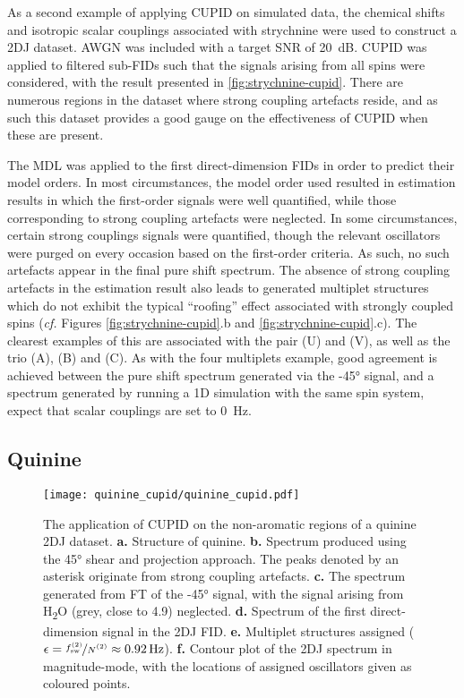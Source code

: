 As a second example of applying \ac{CUPID} on simulated data, the chemical
shifts and isotropic scalar couplings associated with strychnine
were used to construct a 2DJ dataset. \ac{AWGN} was included with a target
\ac{SNR} of \qty{20}{\deci\bel}. CUPID was applied to filtered
sub-FIDs such that the signals arising from all spins were considered, with the
result presented in \cref{fig:strychnine-cupid}. There are numerous
regions in the dataset where strong coupling artefacts reside, and as such this
dataset provides a good gauge on the effectiveness of \ac{CUPID} when these are
present.

The \ac{MDL} was applied to the first direct-dimension \acp{FID} in order to
predict their model orders. In most circumstances, the model order used resulted
in estimation results in which the first-order signals were well
quantified, while those corresponding to strong coupling artefacts were neglected.
In some circumstances, certain strong couplings signals were quantified, though
the relevant oscillators were purged on every occasion based on the first-order
criteria. As such, no such artefacts appear in the final pure shift spectrum.
The absence of strong coupling artefacts in the estimation result also leads to
generated multiplet structures which do not exhibit the typical ``roofing''
effect associated with strongly coupled spins (\textit{cf.} Figures
\ref{fig:strychnine-cupid}.b and \ref{fig:strychnine-cupid}.c). The clearest
examples of this are associated with the pair (U) and (V), as well as the trio (A),
(B) and (C). As with the four multiplets example, good agreement is achieved
between the pure shift spectrum generated via the \ang{-45} signal, and a
spectrum generated by running a \ac{1D} simulation with the same spin system,
expect that scalar couplings are set to \qty{0}{\hertz}.

\subsection{Quinine}
\begin{figure}
    \centering
    \texttt{[image: quinine\_cupid/quinine\_cupid.pdf]}
    \caption[
        The application of \acs{CUPID} on a quinine \acs{2DJ} dataset.
    ]{
        The application of \ac{CUPID} on the non-aromatic regions of a quinine
        \ac{2DJ} dataset.
        \textbf{a.} Structure of quinine.
        \textbf{b.} Spectrum produced using the \ang{45} shear and projection
        approach. The peaks denoted by an asterisk originate from strong
        coupling artefacts.
        \textbf{c.} The spectrum generated from \ac{FT} of the \ang{-45}
        signal, with the signal arising from H\textsubscript{2}O (grey, close
        to \qty{4.9}{\partspermillion}) neglected.
        \textbf{d.} Spectrum of the first direct-dimension signal in the
        \ac{2DJ} \ac{FID}.
        \textbf{e.} Multiplet structures assigned ($\epsilon =
        \nicefrac{\fswtwo}{\Ntwo} \approx \qty{0.92}{\hertz}$).
        \textbf{f.} Contour plot of the \ac{2DJ} spectrum in magnitude-mode,
        with the locations of assigned oscillators given as coloured points.
    }
    \label{fig:quinine-cupid}
\end{figure}

